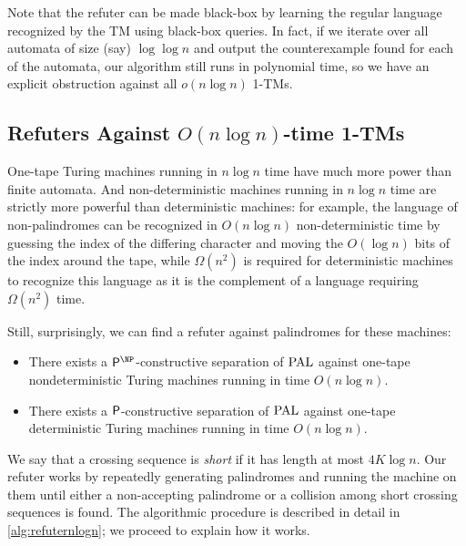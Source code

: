 Note that the refuter can be made black-box by learning the regular language recognized by the TM using black-box queries. 
In fact, if we iterate over all automata of size (say) $\log \log n$ and output the counterexample found for each of the
automata, our algorithm still runs in polynomial time, so we have an explicit obstruction against all $o(n \log n)$ 1-TMs. 


\subsection{Refuters Against $O(n \log n)$-time 1-TMs}

One-tape Turing machines running in $n \log n$ time have much more power than finite automata. And non-deterministic machines running in $n \log n$ time
are strictly more powerful than deterministic machines: for example, the language of non-palindromes can be recognized in $O(n \log n)$
non-deterministic time by guessing the index of the differing character and moving the $O(\log n)$ bits of the index around the tape,
while $\Omega(n^2)$ is required for deterministic machines to recognize this language as it is the complement of a language requiring $\Omega(n^2)$
time. 

Still, surprisingly, we can find a refuter against palindromes for these machines:

\begin{theorem}
    \label{thm:refuternlogn}

    \begin{itemize}
        \item There exists a $\PTIME^\NP$-constructive separation of $\mathrm{PAL}$ against one-tape nondeterministic Turing machines running in time $O(n \log n)$.
        \item There exists a $\mathsf{P}$-constructive separation of $\mathrm{PAL}$ against one-tape deterministic Turing machines running in time $O(n \log n)$.
    \end{itemize}
\end{theorem}


We say that a crossing sequence is \emph{short} if it has length at most $4K \log n$. Our refuter works by repeatedly generating palindromes
and running the machine on them until either a non-accepting palindrome or a collision among short crossing sequences is found. The algorithmic
procedure is described in detail in \cref{alg:refuternlogn}; we proceed to explain how it works. 

